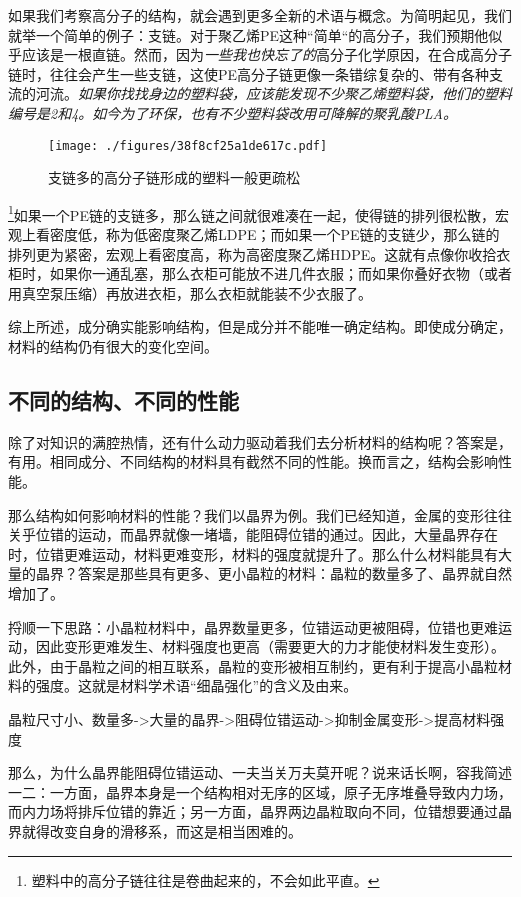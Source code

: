 如果我们考察高分子的结构，就会遇到更多全新的术语与概念。为简明起见，我们就举一个简单的例子：支链。对于聚乙烯PE这种“简单“的高分子，我们预期他似乎应该是一根直链。然而，因为\textsl{一些我也快忘了的}高分子化学原因，在合成高分子链时，往往会产生一些支链，这使PE高分子链更像一条错综复杂的、带有各种支流的河流。\textsl{如果你找找身边的塑料袋，应该能发现不少聚乙烯塑料袋，他们的塑料编号是2和4。如今为了环保，也有不少塑料袋改用可降解的聚乳酸PLA。}
\begin{figure}[ht]
\centering
\texttt{[image: ./figures/38f8cf25a1de617c.pdf]}
\caption{支链多的高分子链形成的塑料一般更疏松} \label{fig_MSEINT_4}
\end{figure}
\footnote{塑料中的高分子链往往是卷曲起来的，不会如此平直。}如果一个PE链的支链多，那么链之间就很难凑在一起，使得链的排列很松散，宏观上看密度低，称为低密度聚乙烯LDPE；而如果一个PE链的支链少，那么链的排列更为紧密，宏观上看密度高，称为高密度聚乙烯HDPE。这就有点像你收拾衣柜时，如果你一通乱塞，那么衣柜可能放不进几件衣服；而如果你叠好衣物（或者用真空泵压缩）再放进衣柜，那么衣柜就能装不少衣服了。

综上所述，成分确实能影响结构，但是成分并不能唯一确定结构。即使成分确定，材料的结构仍有很大的变化空间。
 
\subsection{不同的结构、不同的性能}

除了对知识的满腔热情，还有什么动力驱动着我们去分析材料的结构呢？答案是，有用。相同成分、不同结构的材料具有截然不同的性能。换而言之，结构会影响性能。

那么结构如何影响材料的性能？我们以晶界为例。我们已经知道，金属的变形往往关乎位错的运动，而晶界就像一堵墙，能阻碍位错的通过。因此，大量晶界存在时，位错更难运动，材料更难变形，材料的强度就提升了。那么什么材料能具有大量的晶界？答案是那些具有更多、更小晶粒的材料：晶粒的数量多了、晶界就自然增加了。

捋顺一下思路：小晶粒材料中，晶界数量更多，位错运动更被阻碍，位错也更难运动，因此变形更难发生、材料强度也更高（需要更大的力才能使材料发生变形）。此外，由于晶粒之间的相互联系，晶粒的变形被相互制约，更有利于提高小晶粒材料的强度。这就是材料学术语“细晶强化”的含义及由来。

晶粒尺寸小、数量多->大量的晶界->阻碍位错运动->抑制金属变形->提高材料强度

那么，为什么晶界能阻碍位错运动、一夫当关万夫莫开呢？说来话长啊，容我简述一二：一方面，晶界本身是一个结构相对无序的区域，原子无序堆叠导致内力场，而内力场将排斥位错的靠近；另一方面，晶界两边晶粒取向不同，位错想要通过晶界就得改变自身的滑移系，而这是相当困难的。

